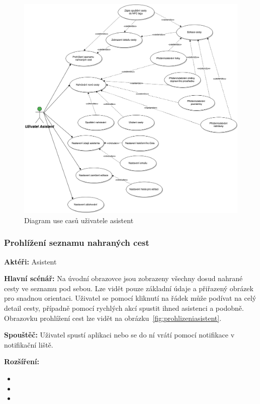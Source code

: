 \documentclass{article}
\newcommand{\usecase}[2]{\subsubsection{#1}\label{#2}}
\begin{document}
\begin{figure}[H]
        \centering
                \includegraphics[scale=0.2]{img/UseCasesAsistant.png}
        \caption{Diagram use casů uživatele asistent}
        \label{fig:UseCasesAsistant}
\end{figure}

\usecase{Prohlížení seznamu nahraných cest}{prohlizeniasistent}
\textbf{Aktéři:} Asistent

\vspace{0.1cm}
\noindent
\textbf{Hlavní scénář:} Na úvodní obrazovce jsou zobrazeny všechny dosud nahrané cesty ve seznamu pod sebou.
Lze vidět pouze základní údaje a přiřazený obrázek pro snadnou orientaci. Uživatel se pomocí
kliknutí na řádek může podívat na celý detail cesty, případně pomocí rychlých akcí spustit ihned asistenci
a podobně. Obrazovku prohlížení cest lze vidět na obrázku~\ref{fig:prohlizeniasistent}.

\vspace{0.1cm}
\noindent
\textbf{Spouštěč:} Uživatel spustí aplikaci nebo se do ní vrátí pomocí notifikace v notifikační liště.

\vspace{0.1cm}
\noindent
\textbf{Rozšíření:}
\begin{itemize}
  \item {}
  \item {}
  \item {}
\end{itemize}
\end{document}
